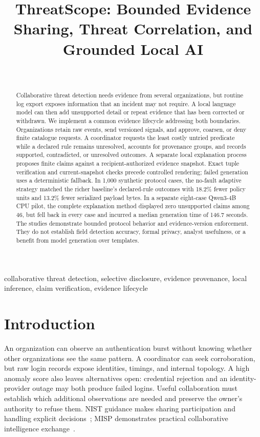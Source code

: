 \documentclass[conference,letterpaper]{IEEEtran}
\title{ThreatScope: Bounded Evidence Sharing, Threat Correlation, and Grounded Local AI}
\author{\IEEEauthorblockN{Ananay Srivastava, Jitendra Singh, Manik Bhardwaj, Ashish Jain, Mukunj Singh}\\
\IEEEauthorblockA{Department of Computer Science and Engineering, Sharda University, Greater Noida, India}}
\begin{document}
\maketitle
\begin{abstract}
Collaborative threat detection needs evidence from several organizations, but routine log export exposes information that an incident may not require. A local language model can then add unsupported detail or repeat evidence that has been corrected or withdrawn. We implement a common evidence lifecycle addressing both boundaries. Organizations retain raw events, send versioned signals, and approve, coarsen, or deny finite catalogue requests. A coordinator requests the least costly untried predicate while a declared rule remains unresolved, accounts for provenance groups, and records supported, contradicted, or unresolved outcomes. A separate local explanation process proposes finite claims against a recipient-authorized evidence snapshot. Exact tuple verification and current-snapshot checks precede controlled rendering; failed generation uses a deterministic fallback. In 1,000 synthetic protocol cases, the no-fault adaptive strategy matched the richer baseline's declared-rule outcomes with 18.2\% fewer policy units and 13.2\% fewer serialized payload bytes. In a separate eight-case Qwen3-4B CPU pilot, the complete explanation method displayed zero unsupported claims among 46, but fell back in every case and incurred a median generation time of 146.7 seconds. The studies demonstrate bounded protocol behavior and evidence-version enforcement. They do not establish field detection accuracy, formal privacy, analyst usefulness, or a benefit from model generation over templates.
\end{abstract}
\begin{IEEEkeywords}
collaborative threat detection, selective disclosure, evidence provenance, local inference, claim verification, evidence lifecycle
\end{IEEEkeywords}

\section{Introduction}
An organization can observe an authentication burst without knowing whether other organizations see the same pattern. A coordinator can seek corroboration, but raw login records expose identities, timings, and internal topology. A high anomaly score also leaves alternatives open: credential rejection and an identity-provider outage may both produce failed logins. Useful collaboration must establish which additional observations are needed and preserve the owner's authority to refuse them. NIST guidance makes sharing participation and handling explicit decisions~\cite{nist150}; MISP demonstrates practical collaborative intelligence exchange~\cite{misp}.
\end{document}
